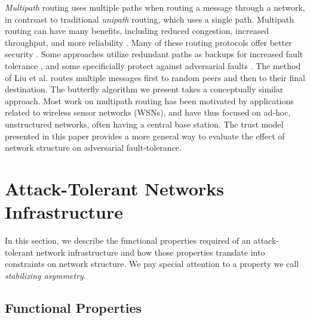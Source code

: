 \documentclass[prodmode,permissions]{acmsmall-ec16}
\begin{document}
{\em Multipath} routing uses multiple paths when routing a message through a
network, in contrsast to traditional {\em unipath} routing, which uses
a single path.
Multipath routing can have many benefits, including reduced congestion,
increased throughput, and more reliability
\cite{qadir_exploiting_2015}.
Many of these routing protocols offer better security 
\cite{zin_survey_2015}.
Some approaches utilize redundant paths as backups for increased
fault tolerance
\cite{alrajeh_secure_2013},
and some specificially protect against adversarial faults
\cite{kohno_improvement_2012, khalil_unmask:_2010, lou_h-spread:_2006}.
The method of Liu et al.
\cite{liu_secure_2012}
routes multiple messages first to random peers and then
to their final destination.
The butterfly algorithm we present takes a conceptually similar approach.
Most work on multipath routing has been motivated by applications related to
wireless sensor networks (WSNs),
and have thus focused on ad-hoc, unstructured networks, often having a central
base station.
The trust model presented in this paper provides a more general way to evaluate
the effect of network structure on adversarial fault-tolerance.

\section{Attack-Tolerant Networks Infrastructure}

In this section, we describe the functional properties required of an
attack-tolerant network infrastructure and how those properties translate
into constraints on network structure.
We pay special attention to a property we call
{\em stabilizing asymmetry}.

\subsection{Functional Properties}
\end{document}

